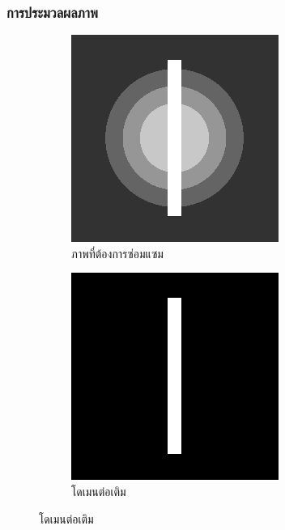 \documentclass[xcolor=dvipsnames, xetex,serif]{beamer}
\numberwithin{equation}{section}
\begin{document}
		\begin{frame}
		\frametitle{การประมวลผลภาพ}
			\begin{figure}[H]
				\centering
				\begin{subfigure}{0.3\linewidth}
					\centering
					\includegraphics[width=0.8\linewidth]{images/grayscale_inpaint/toinpaint.png}
					\caption{ภาพที่ต้องการซ่อมแซม}
				\end{subfigure}
				\begin{subfigure}{0.3\linewidth}
					\centering
					\includegraphics[width=0.8\linewidth]{images/grayscale_inpaint/inpaintdomain.png}
					\caption{โดเมนต่อเติม}

\end{subfigure}
\end{figure}
\end{frame}
\end{document}
